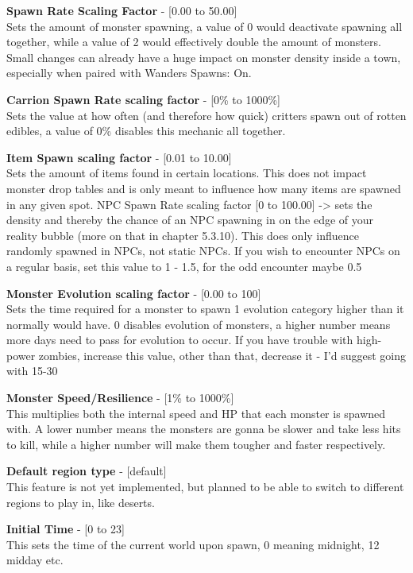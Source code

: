\textbf{Spawn Rate Scaling Factor} - [0.00 to 50.00]\\Sets the amount of monster spawning, a value of 0 would deactivate spawning all together, while a value of 2 would effectively double the amount of monsters. Small changes can already have a huge impact on monster density inside a town, especially when paired with Wanders Spawns: On.

\textbf{Carrion Spawn Rate scaling factor} - [0\% to 1000\%]\\Sets the value at how often (and therefore how quick) critters spawn out of rotten edibles, a value of 0\% disables this mechanic all together.

\textbf{Item Spawn scaling factor} - [0.01 to 10.00]\\Sets the amount of items found in certain locations. This does not impact monster drop tables and is only meant to influence how many items are spawned in any given spot.
NPC Spawn Rate scaling factor [0 to 100.00] -> sets the density and thereby the chance of an NPC spawning in on the edge of your reality bubble (more on that in chapter 5.3.10). This does only influence randomly spawned in NPCs, not static NPCs. If you wish to encounter NPCs on a regular basis, set this value to 1 - 1.5, for the odd encounter maybe 0.5

\textbf{Monster Evolution scaling factor} - [0.00 to 100]\\Sets the time required for a monster to spawn 1 evolution category higher than it normally would have. 0 disables evolution of monsters, a higher number means more days need to pass for evolution to occur. If you have trouble with high-power zombies, increase this value, other than that, decrease it - I'd suggest going with 15-30

\textbf{Monster Speed/Resilience} - [1\% to 1000\%]\\This multiplies both the internal speed and HP that each monster is spawned with. A lower number means the monsters are gonna be slower and take less hits to kill, while a higher number will make them tougher and faster respectively.

\textbf{Default region type} - [default]\\This feature is not yet implemented, but planned to be able to switch to different regions to play in, like deserts.

\textbf{Initial Time} - [0 to 23]\\This sets the time of the current world upon spawn, 0 meaning midnight, 12 midday etc.

